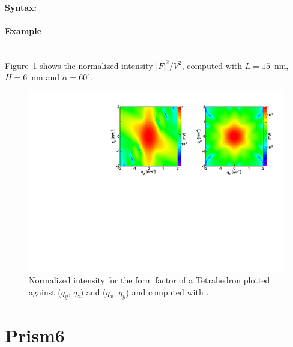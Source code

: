 \paragraph{Syntax:} 

\paragraph{Example}\mbox{}\\
Figure~\ref{fig:FFtetrahEx} shows the normalized intensity
$|F|^2/V^2$, computed with $L=15$~nm, $H=6$~nm and $\alpha =60
^{\circ}$.

\begin{figure}[ht]
\begin{center}
\includegraphics[angle=-90,width=\textwidth]{Figures/ff/figfftetrahedron.pdf}
\end{center}
\caption{Normalized intensity for the form factor of a Tetrahedron
  plotted against ($q_y$, $q_z$) and  ($q_x$, $q_y$) and
  computed with .}
\label{fig:FFtetrahEx}
\end{figure}


\newpage
\section{Prism6} 

